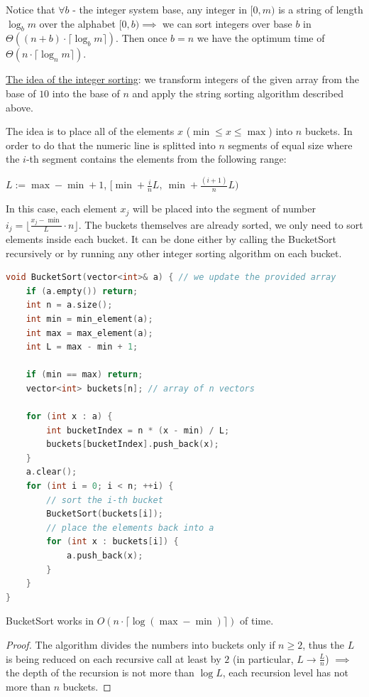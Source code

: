 Notice that $\forall b$ - the integer system base, any integer in $[0, m)$ is a string of length $\log_{b}{m}$ over the alphabet $[0, b) \implies$ we can sort integers over base $b$ in $\Theta((n + b) \cdot \lceil \log_{b}{m} \rceil)$. Then once $b = n$ we have the optimum time of $\Theta(n \cdot \lceil \log_{n}{m} \rceil)$.

\underline{The idea of the integer sorting}: we transform integers of the given array from the base of $10$ into the base of $n$ and apply the string sorting algorithm described above.



The idea is to place all of the elements $x$ ($\min \leq x \leq \max$) into $n$ buckets. In order to do that the numeric line is splitted into $n$ segments of equal size where the $i$-th segment contains the elements from the following range:

$L := \max - \min + 1$, $[\min + \frac{i}{n}L, \ \min + \frac{(i+1)}{n}L)$

In this case, each element $x_j$ will be placed into the segment of number $i_j = \lfloor \frac{x_j - \min}{L} \cdot n \rfloor$. The buckets themselves are already sorted, we only need to sort elements inside each bucket. It can be done either by calling the BucketSort recursively or by running any other integer sorting algorithm on each bucket.

\begin{lstlisting}[language=C++]
void BucketSort(vector<int>& a) { // we update the provided array
    if (a.empty()) return;
    int n = a.size();
    int min = min_element(a);
    int max = max_element(a);
    int L = max - min + 1;

    if (min == max) return;
    vector<int> buckets[n]; // array of n vectors

    for (int x : a) {
        int bucketIndex = n * (x - min) / L;
        buckets[bucketIndex].push_back(x);
    }
    a.clear();
    for (int i = 0; i < n; ++i) {
        // sort the i-th bucket
        BucketSort(buckets[i]);
        // place the elements back into a
        for (int x : buckets[i]) {
            a.push_back(x);
        }
    }
}
\end{lstlisting}

\begin{lemma}
    BucketSort works in $O(n \cdot \lceil \log{(\max - \min)} \rceil)$ of time.
\end{lemma}

\begin{proof}
    The algorithm divides the numbers into buckets only if $n \geq 2$, thus the $L$ is being reduced on each recursive call at least by $2$ (in particular, $L \to \frac{L}{n}$) $\implies$ the depth of the recursion is not more than $\log{L}$, each recursion level has not more than $n$ buckets.
\end{proof}